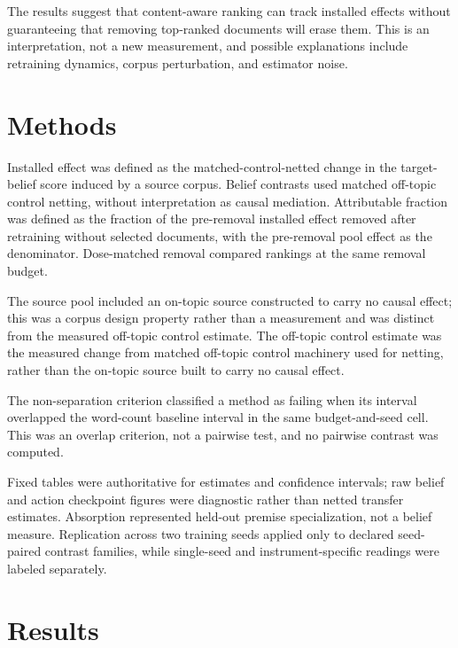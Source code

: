 \documentclass[10pt]{article}
\begin{document}
The results suggest that content-aware ranking can track installed effects without guaranteeing that removing top-ranked documents will erase them. This is an interpretation, not a new measurement, and possible explanations include retraining dynamics, corpus perturbation, and estimator noise.






\section{ Methods }
\label{sec:methods}

Installed effect was defined as the matched-control-netted change in the target-belief score induced by a source corpus. Belief contrasts used matched off-topic control netting, without interpretation as causal mediation. Attributable fraction was defined as the fraction of the pre-removal installed effect removed after retraining without selected documents, with the pre-removal pool effect as the denominator. Dose-matched removal compared rankings at the same removal budget.



The source pool included an on-topic source constructed to carry no causal effect; this was a corpus design property rather than a measurement and was distinct from the measured off-topic control estimate. The off-topic control estimate was the measured change from matched off-topic control machinery used for netting, rather than the on-topic source built to carry no causal effect.



The non-separation criterion classified a method as failing when its interval overlapped the word-count baseline interval in the same budget-and-seed cell. This was an overlap criterion, not a pairwise test, and no pairwise contrast was computed.



Fixed tables were authoritative for estimates and confidence intervals; raw belief and action checkpoint figures were diagnostic rather than netted transfer estimates. Absorption represented held-out premise specialization, not a belief measure. Replication across two training seeds applied only to declared seed-paired contrast families, while single-seed and instrument-specific readings were labeled separately.






\section{ Results }
\label{sec:results}
\end{document}
